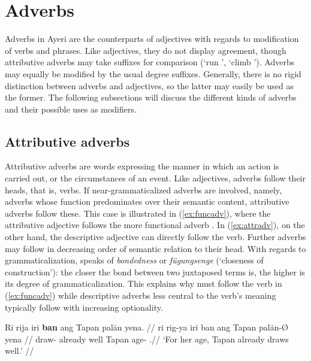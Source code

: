 
\section{Adverbs}
\label{sec:adverbs}

Adverbs in Ayeri are the counterparts of adjectives with regards to
modification of verbs and phrases. Like adjectives, they do not display
agreement, though attributive adverbs may take suffixes for comparison (`run
', `climb '). Adverbs may equally be modified by the
usual degree suffixes. Generally, there is no rigid distinction between adverbs
and adjectives, so the latter may easily be used as the former. The following
subsections will discuss the different kinds of adverbs and their possible uses
as modifiers.

\subsection{Attributive adverbs}

Attributive adverbs are words expressing the manner in which an action is
carried out, or the circumstances of an event. Like adjectives, adverbs follow
their heads, that is, verbs. If near-grammaticalized adverbs are involved,
namely, adverbs whose function predominates over their semantic content,
attributive adverbs follow these. This case is illustrated in
(\ref{ex:funcadv}), where the attributive adjective 
follows the more functional adverb . In
(\ref{ex:attradv}), on the other hand, the descriptive adjective
 can directly follow the verb. Further adverbs may
follow in decreasing order of semantic relation to their head. With regards to
grammaticalization, \citet[157\psqq]{lehmann2015} speaks of \emph{bondedness}
or \emph{fügungsenge} (`closeness of construction'): the closer the bond
between two juxtaposed terms is, the higher is its degree of
grammaticalization. This explains why  must follow the verb in
(\ref{ex:funcadv}) while descriptive adverbs less central to the verb's meaning
typically follow with increasing optionality.

\pex
\a\label{ex:funcadv}\begingl
	\gla Ri rija iri \textbf{ban} ang Tapan palān yena. //
	\glb ri rig-ya iri ban ang Tapan palān-Ø yena //
	\glc \InsT{} draw-\TsgM{} already well \Aarg{} Tapan age-\Top{} 
		\TsgF{}.\Gen //
	\glft `For her age, Tapan already draws well.' //
\endgl

